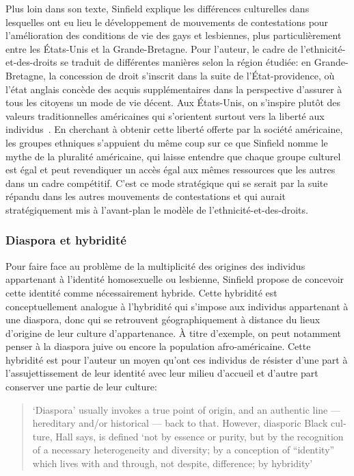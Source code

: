 Plus loin dans son texte, Sinfield explique les différences culturelles dans lesquelles ont eu lieu le développement de mouvements de contestations pour l'amélioration des conditions de vie des gays et lesbiennes, plus particulièrement entre les États-Unis et la Grande-Bretagne. 
Pour l'auteur, le cadre de l'ethnicité-et-des-droits se traduit de différentes manières selon la région étudiée: en Grande-Bretagne, la concession de droit s'inscrit dans la suite de l'État-providence, où l'état anglais concède des acquis supplémentaires dans la perspective d'assurer à tous les citoyens un mode de vie décent. 
Aux États-Unis, on s'inspire plutôt des valeurs traditionnelles américaines qui s'orientent surtout vers la liberté aux individus~\citep[274]{Sinfield1996}. 
En cherchant à obtenir cette liberté offerte par la société américaine, les groupes ethniques s'appuient du même coup sur ce que Sinfield nomme le mythe de la pluralité américaine, qui laisse entendre que chaque groupe culturel est égal et peut revendiquer un accès égal aux mêmes ressources que les autres dans un cadre compétitif. 
C'est ce mode stratégique qui se serait par la suite répandu dans les autres mouvements de contestations et qui aurait stratégiquement mis à l'avant-plan le modèle de l'ethnicité-et-des-droits.

\subsubsection{Diaspora et hybridité}
\label{sub:diaspora_et_hybridit_} Pour faire face au problème de la multiplicité des origines des individus appartenant à l'identité homosexuelle ou lesbienne, Sinfield propose de concevoir cette identité comme nécessairement hybride. 
Cette hybridité est conceptuellement analogue à l'hybridité qui s'impose aux individus appartenant à une diaspora, donc qui se retrouvent géographiquement à distance du lieux d'origine de leur culture d'appartenance. 
À titre d'exemple, on peut notamment penser à la diaspora juive ou encore la population afro-américaine.
Cette hybridité est pour l'auteur un moyen qu'ont ces individus de résister d'une part à l'assujettissement de leur identité avec leur milieu d'accueil et d'autre part conserver une partie de leur culture: \foreignblockquote{english}[{\cite[278]{Sinfield1996}}][.]{`Diaspora' \textelp{}   usually invokes a true point of origin, and an authentic line --- hereditary   and/or historical --- back to that. However, diasporic Black culture, Hall   says, is defined `not by essence or purity, but by the recognition of a   necessary heterogeneity and diversity; by a conception of ``identity'' which   lives with and through, not despite, difference; by hybridity'}

